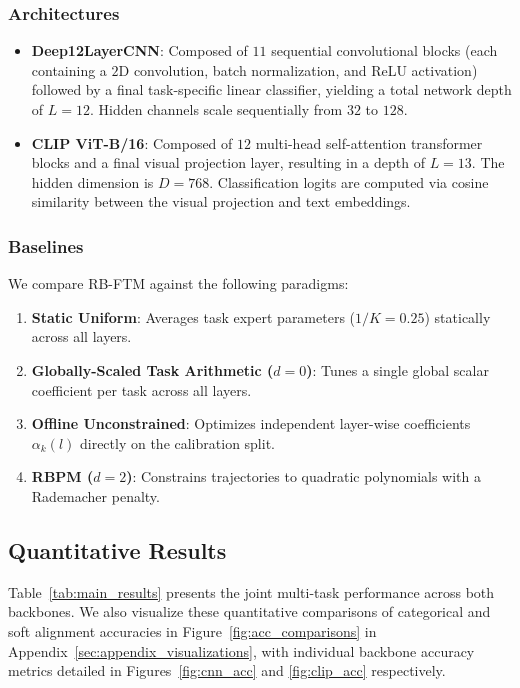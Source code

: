 \subsubsection{Architectures}
\begin{itemize}
    \item \textbf{Deep12LayerCNN}: Composed of $11$ sequential convolutional blocks (each containing a $2$D convolution, batch normalization, and ReLU activation) followed by a final task-specific linear classifier, yielding a total network depth of $L=12$. Hidden channels scale sequentially from $32$ to $128$.
    \item \textbf{CLIP ViT-B/16}: Composed of $12$ multi-head self-attention transformer blocks and a final visual projection layer, resulting in a depth of $L=13$. The hidden dimension is $D=768$. Classification logits are computed via cosine similarity between the visual projection and text embeddings.
\end{itemize}

\subsubsection{Baselines}
We compare RB-FTM against the following paradigms:
\begin{enumerate}
    \item \textbf{Static Uniform}: Averages task expert parameters ($1/K=0.25$) statically across all layers.
    \item \textbf{Globally-Scaled Task Arithmetic ($d=0$)}: Tunes a single global scalar coefficient per task across all layers.
    \item \textbf{Offline Unconstrained}: Optimizes independent layer-wise coefficients $\alpha_k(l)$ directly on the calibration split.
    \item \textbf{RBPM ($d=2$)}: Constrains trajectories to quadratic polynomials with a Rademacher penalty.
\end{enumerate}

\subsection{Quantitative Results}
Table~\ref{tab:main_results} presents the joint multi-task performance across both backbones. We also visualize these quantitative comparisons of categorical and soft alignment accuracies in Figure~\ref{fig:acc_comparisons} in Appendix~\ref{sec:appendix_visualizations}, with individual backbone accuracy metrics detailed in Figures~\ref{fig:cnn_acc} and \ref{fig:clip_acc} respectively.

